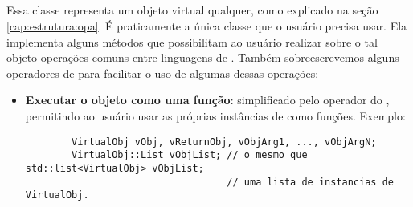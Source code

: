   \subsection{\VObj{}}
  \label{sec:atividades:opa:vobj}
  Essa classe representa um objeto virtual qualquer, como explicado na seção
  \ref{cap:estrutura:opa}. É praticamente a única classe que o
  usuário precisa usar. Ela implementa alguns métodos que possibilitam ao
  usuário realizar sobre o tal objeto operações comuns entre linguagens de
  \script{}. Também sobreescrevemos alguns operadores de \CXX{} para facilitar o
  uso de algumas dessas operações:
  \begin{itemize}
    \item \textbf{Executar o objeto como uma função}: simplificado pelo operador \lang{()}
      do \CXX{}, permitindo ao usuário usar as próprias instâncias de \VObj{} como
      funções. Exemplo:
      \begin{lstlisting}
        VirtualObj vObj, vReturnObj, vObjArg1, ..., vObjArgN; 
        VirtualObj::List vObjList; // o mesmo que std::list<VirtualObj> vObjList;
                                   // uma lista de instancias de VirtualObj.
                                   

\end{lstlisting}
\end{itemize}
